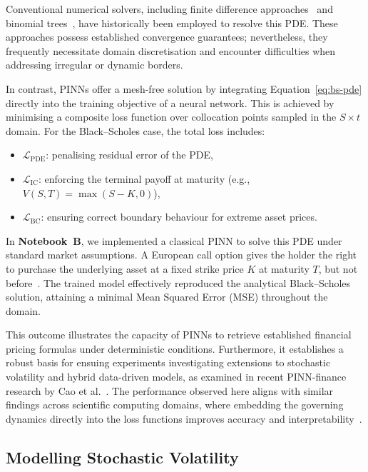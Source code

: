 \documentclass[12pt,a4paper]{article}
\begin{document}
Conventional numerical solvers, including finite difference approaches~\cite{leveque2007finite} and binomial trees~\cite{morton2005numerical}, have historically been employed to resolve this PDE. These approaches possess established convergence guarantees; nevertheless, they frequently necessitate domain discretisation and encounter difficulties when addressing irregular or dynamic borders. 

In contrast, PINNs offer a mesh-free solution by integrating Equation~\eqref{eq:bs-pde} directly into the training objective of a neural network. This is achieved by minimising a composite loss function over collocation points sampled in the \(S \times t\) domain. For the Black–Scholes case, the total loss includes:
\begin{itemize}
  \item \(\mathcal{L}_{\text{PDE}}\): penalising residual error of the PDE,
  \item \(\mathcal{L}_{\text{IC}}\): enforcing the terminal payoff at maturity (e.g., \(V(S,T)=\max(S - K, 0)\)),
  \item \(\mathcal{L}_{\text{BC}}\): ensuring correct boundary behaviour for extreme asset prices.
\end{itemize}

In \textbf{Notebook~B}, we implemented a classical PINN to solve this PDE under standard market assumptions. A European call option gives the holder the right to purchase the underlying asset at a fixed strike price \(K\) at maturity \(T\), but not before~\cite{hull2018options}. The trained model effectively reproduced the analytical Black–Scholes solution, attaining a minimal Mean Squared Error (MSE) throughout the domain.

This outcome illustrates the capacity of PINNs to retrieve established financial pricing formulas under deterministic conditions. Furthermore, it establishes a robust basis for ensuing experiments investigating extensions to stochastic volatility and hybrid data-driven models, as examined in recent PINN-finance research by Cao et al.~\cite{cao2021sde}. The performance observed here aligns with similar findings across scientific computing domains, where embedding the governing dynamics directly into the loss functions improves accuracy and interpretability~\cite{karniadakis2021physics}.

\subsection{Modelling Stochastic Volatility}
\end{document}
